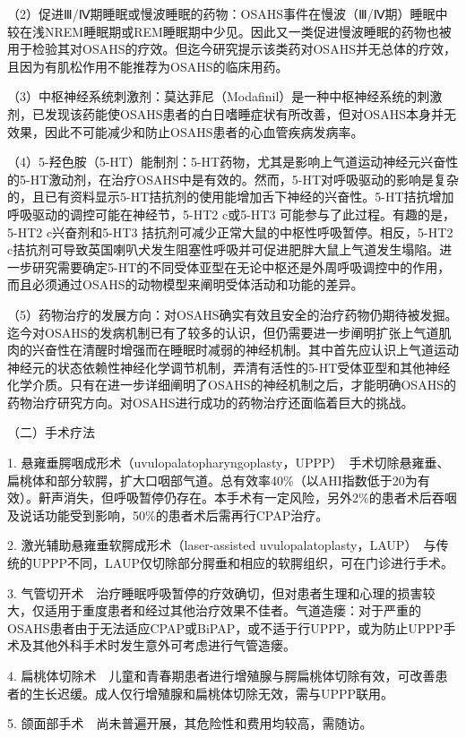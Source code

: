 （2）促进Ⅲ/Ⅳ期睡眠或慢波睡眠的药物：OSAHS事件在慢波（Ⅲ/Ⅳ期）睡眠中较在浅NREM睡眠期或REM睡眠期中少见。因此又一类促进慢波睡眠的药物也被用于检验其对OSAHS的疗效。但迄今研究提示该类药对OSAHS并无总体的疗效，且因为有肌松作用不能推荐为OSAHS的临床用药。

（3）中枢神经系统刺激剂：莫达菲尼（Modafinil）是一种中枢神经系统的刺激剂，已发现该药能使OSAHS患者的白日嗜睡症状有所改善，但对OSAHS本身并无效果，因此不可能减少和防止OSAHS患者的心血管疾病发病率。

（4）5-羟色胺（5-HT）能制剂：5-HT药物，尤其是影响上气道运动神经元兴奋性的5-HT激动剂，在治疗OSAHS中是有效的。然而，5-HT对呼吸驱动的影响是复杂的，且已有资料显示5-HT拮抗剂的使用能增加舌下神经的兴奋性。5-HT拮抗增加呼吸驱动的调控可能在神经节，5-HT{2}
c或5-HT{3} 可能参与了此过程。有趣的是，5-HT{2} c兴奋剂和5-HT{3}
拮抗剂可减少正常大鼠的中枢性呼吸暂停。相反，5-HT{2}
c拮抗剂可导致英国喇叭犬发生阻塞性呼吸并可促进肥胖大鼠上气道发生塌陷。进一步研究需要确定5-HT的不同受体亚型在无论中枢还是外周呼吸调控中的作用，而且必须通过OSAHS的动物模型来阐明受体活动和功能的差异。

（5）药物治疗的发展方向：对OSAHS确实有效且安全的治疗药物仍期待被发掘。迄今对OSAHS的发病机制已有了较多的认识，但仍需要进一步阐明扩张上气道肌肉的兴奋性在清醒时增强而在睡眠时减弱的神经机制。其中首先应认识上气道运动神经元的状态依赖性神经化学调节机制，弄清有活性的5-HT受体亚型和其他神经化学介质。只有在进一步详细阐明了OSAHS的神经机制之后，才能明确OSAHS的药物治疗研究方向。对OSAHS进行成功的药物治疗还面临着巨大的挑战。

{（二）手术疗法}

1.
悬雍垂腭咽成形术（uvulopalatopharyngoplasty，UPPP）　手术切除悬雍垂、扁桃体和部分软腭，扩大口咽部气道。总有效率40\%（以AHI指数低于20为有效）。鼾声消失，但呼吸暂停仍存在。本手术有一定风险，另外2\%的患者术后吞咽及说话功能受到影响，50\%的患者术后需再行CPAP治疗。

2. 激光辅助悬雍垂软腭成形术（laser-assisted
uvulopalatoplasty，LAUP）　与传统的UPPP不同，LAUP仅切除部分腭垂和相应的软腭组织，可在门诊进行手术。

3.
气管切开术　治疗睡眠呼吸暂停的疗效确切，但对患者生理和心理的损害较大，仅适用于重度患者和经过其他治疗效果不佳者。气道造瘘：对于严重的OSAHS患者由于无法适应CPAP或BiPAP，或不适于行UPPP，或为防止UPPP手术及其他外科手术时发生意外可考虑进行气管造瘘。

4.
扁桃体切除术　儿童和青春期患者进行增殖腺与腭扁桃体切除有效，可改善患者的生长迟缓。成人仅行增殖腺和扁桃体切除无效，需与UPPP联用。

5. 颌面部手术　尚未普遍开展，其危险性和费用均较高，需随访。

